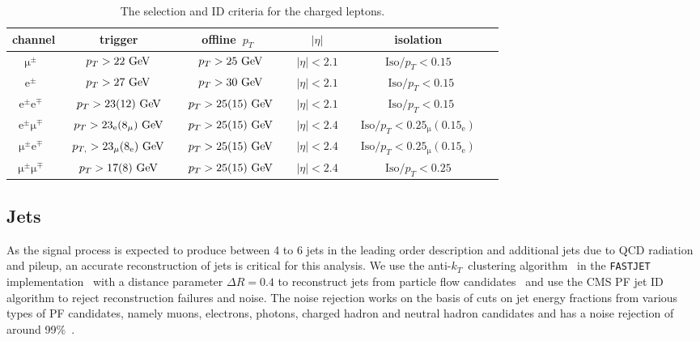 \begin{table}[h!]
\begin{center}
\caption{The selection and ID criteria for the charged leptons.}
\label{tab:lepton_selection}
\begin{tabular}{c|ccccc}
\hline
channel & trigger & offline~$p_T$~&~$|\eta|$~& isolation \\
\hline
$\mathrm{\mu}^\pm$~&~$p_T > 22~\mathrm{GeV}$~&~$p_T > 25~\mathrm{GeV}$~&~$|\eta| < 2.1$~& ~$\mathrm{Iso}/p_T < 0.15$~\\

$\mathrm{e}^\pm$~&~$p_T > 27~\mathrm{GeV}$~&~$p_T > 30~\mathrm{GeV}$~&~$|\eta| < 2.1$~&~$\mathrm{Iso}/p_T < 0.15$\\

$\mathrm{e}^\pm\mathrm{e}^\mp$~&~$p_T > 23 (12)~\mathrm{GeV}$~&~$p_T > 25 (15)~\mathrm{GeV}$~&~$|\eta| < 2.1$~&~$\mathrm{Iso}/p_T < 0.15$\\

$\mathrm{e}^\pm\mathrm{\mu}^\mp$~&~$p_{T} > 23_{\mathrm{e}} (8_{\mathrm{\mu}})~\mathrm{GeV}$~&~$p_T > 25 (15)~\mathrm{GeV}$~&~$|\eta| < 2.4$~&~$\mathrm{Iso}/p_T < 0.25_{\mathrm{\mu}} (0.15_{\mathrm{e}})$~\\

$\mathrm{\mu}^\pm\mathrm{e}^\mp$~&~$p_{T,} > 23_{\mathrm{\mu}} (8_{\mathrm{e}})~\mathrm{GeV}$~&~$p_T > 25 (15)~\mathrm{GeV}$~&~$|\eta| < 2.4$~&~$\mathrm{Iso}/p_T < 0.25_{\mathrm{\mu}} (0.15_{\mathrm{e}})$~\\

$\mathrm{\mu}^\pm\mathrm{\mu}^\mp$~&~$p_T > 17 (8)~\mathrm{GeV}$~&~$p_T > 25 (15)~\mathrm{GeV}$~&~$|\eta| < 2.4$~&~$\mathrm{Iso}/p_T < 0.25$~\\

\hline
\hline
\end{tabular}
\end{center}
\end{table}

\subsection{Jets}
\label{sec:object_id_jets}
As the signal process is expected to produce between 4 to 6 jets in the leading order description and additional jets due to QCD radiation and pileup, an accurate reconstruction of jets is critical for this analysis. We use the anti-$k_T$~clustering algorithm~\cite{Cacciari:2008gp} in the \texttt{FASTJET} implementation~\cite{Cacciari:2011ma} with a distance parameter $\Delta R=0.4$ to reconstruct jets from particle flow candidates~\cite{CMS:2010xta,CMS:2009nxa,CMS:2010byl} and use the CMS PF jet ID algorithm to reject reconstruction failures and noise. The noise rejection works on the basis of cuts on jet energy fractions from various types of PF candidates, namely muons, electrons, photons, charged hadron and neutral hadron candidates and has a noise rejection of around 99\%~\cite{CMS:2017wyc}.

